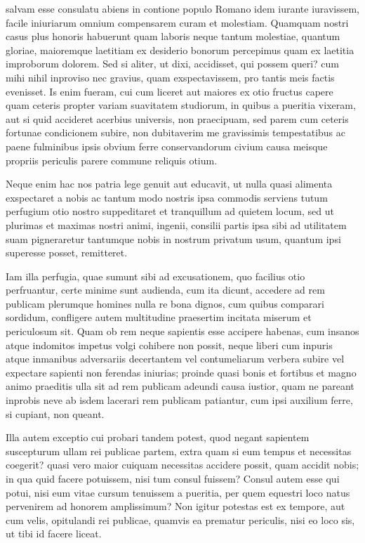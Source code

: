  salvam esse consulatu abiens in contione populo Romano idem iurante iuravissem, facile iniuriarum omnium compensarem curam et molestiam. Quamquam nostri casus plus honoris habuerunt quam laboris neque tantum molestiae, quantum gloriae, maioremque laetitiam ex desiderio bonorum percepimus quam ex laetitia improborum dolorem. Sed si aliter, ut dixi, accidisset, qui possem queri? cum mihi nihil inproviso nec gravius, quam exspectavissem, pro tantis meis factis evenisset. Is enim fueram, cui cum liceret aut maiores ex otio fructus capere quam ceteris propter variam suavitatem studiorum, in quibus a pueritia vixeram, aut si quid accideret acerbius universis, non praecipuam, sed parem cum ceteris fortunae condicionem subire, non dubitaverim me gravissimis tempestatibus ac paene fulminibus ipsis obvium ferre conservandorum civium causa meisque propriis periculis parere commune reliquis otium.

 Neque enim hac nos patria lege genuit aut educavit, ut nulla quasi alimenta exspectaret a nobis ac tantum modo nostris ipsa commodis serviens tutum perfugium otio nostro suppeditaret et tranquillum ad quietem locum, sed ut plurimas et maximas nostri animi, ingenii, consilii partis ipsa sibi ad utilitatem suam pigneraretur tantumque nobis in nostrum privatum usum, quantum ipsi superesse posset, remitteret.

 Iam illa perfugia, quae sumunt sibi ad excusationem, quo facilius otio perfruantur, certe minime sunt audienda, cum ita dicunt, accedere ad rem publicam plerumque homines nulla re bona dignos, cum quibus comparari sordidum, confligere autem multitudine praesertim incitata miserum et periculosum sit. Quam ob rem neque sapientis esse accipere habenas, cum insanos atque indomitos impetus volgi cohibere non possit, neque liberi cum inpuris atque inmanibus adversariis decertantem vel contumeliarum verbera subire vel expectare sapienti non ferendas iniurias; proinde quasi bonis et fortibus et magno animo praeditis ulla sit ad rem publicam adeundi causa iustior, quam ne pareant inprobis neve ab isdem lacerari rem publicam patiantur, cum ipsi auxilium ferre, si cupiant, non queant.

 Illa autem exceptio cui probari tandem potest, quod negant sapientem suscepturum ullam rei publicae partem, extra quam si eum tempus et necessitas coegerit? quasi vero maior cuiquam necessitas accidere possit, quam accidit nobis; in qua quid facere potuissem, nisi tum consul fuissem? Consul autem esse qui potui, nisi eum vitae cursum tenuissem a pueritia, per quem equestri loco natus pervenirem ad honorem amplissimum? Non igitur potestas est ex tempore, aut cum velis, opitulandi rei publicae, quamvis ea prematur periculis, nisi eo loco sis, ut tibi id facere liceat.

